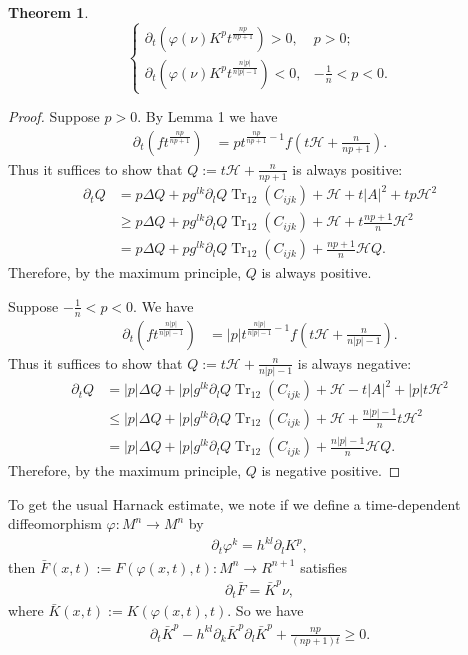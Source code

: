 \documentclass{amsart}
\newtheorem{theorem}{Theorem}
\theoremstyle{definition}
\theoremstyle{remark}
\DeclareMathOperator{\Tr}{Tr}
\numberwithin{equation}{section}
\begin{document}
\begin{theorem}
\[\left\{
  \begin{array}{ll}
    \partial_t \left(\varphi(\nu)K^pt^{\frac{n p }{n p +1}}\right)> 0, & p>0; \\
    \partial_t \left(\varphi(\nu)K^pt^{\frac{n |p| }{n |p| -1}}\right)<0, & -\frac{1}{n}<p<0.
  \end{array}
\right.
\]
\end{theorem}
\begin{proof}
Suppose $p>0.$
By Lemma 1 we have
\begin{align*}
\partial_t \left(ft^{\frac{n p }{n p +1}}\right)&= p  t^{\frac{n p }{n p +1}-1}f\left(t\mathcal{H}+\frac{n}{n p +1}\right).
\end{align*}
Thus it suffices to show that $Q:=t\mathcal{H}+\frac{n}{n p +1}$ is always positive:
\begin{align*}
\partial_t Q&= p\Delta Q+ p  g^{lk}\partial_lQ \Tr_{12}( C _{ijk})+\mathcal{H}+t| A |^2+  tp \mathcal{H}^2\\
&\geq  p \Delta Q+ p  g^{lk}\partial_lQ \Tr_{12}( C _{ijk})+\mathcal{H}+t\frac{n p +1}{n} \mathcal{H}^2\\
&= p \Delta Q+ p  g^{lk}\partial_lQ \Tr_{12}( C _{ijk})+\frac{n p +1}{n}\mathcal{H}Q.
\end{align*}
Therefore, by the maximum principle, $Q$ is always positive.


Suppose $-\frac{1}{n}<p<0.$ We have
\begin{align*}
\partial_t \left(ft^{\frac{n |p| }{n |p| -1}}\right)&= |p|  t^{\frac{n |p| }{n |p| -1}-1}f\left(t\mathcal{H}+\frac{n}{n |p| -1}\right).
\end{align*}
Thus it suffices to show that $Q:=t\mathcal{H}+\frac{n}{n |p| -1}$ is always negative:
\begin{align*}
\partial_t Q&= |p| \Delta Q+ |p|  g^{lk}\partial_lQ \Tr_{12}( C _{ijk})+\mathcal{H}-t| A |^2+ |p|  t \mathcal{H}^2\\
&\leq  |p| \Delta Q+ |p|  g^{lk}\partial_lQ \Tr_{12}( C _{ijk})+\mathcal{H}+\frac{n |p| -1}{n}t \mathcal{H}^2\\
&= |p| \Delta Q+ |p|  g^{lk}\partial_lQ \Tr_{12}( C _{ijk})+\frac{n |p| -1}{n}\mathcal{H}Q.
\end{align*}
Therefore, by the maximum principle, $Q$ is negative positive.
\end{proof}

To get the usual Harnack estimate, we note if we define a time-dependent diffeomorphism $\varphi: M^n\to M^n$ by
\begin{align}
\partial_t\varphi^k=h^{kl}\partial_l K^{ p },
\end{align}
then $\bar{F}(x,t):=F(\varphi(x,t),t):M^{n}\to R^{n+1}$ satisfies
\begin{align}
\partial_t\bar{F}=\bar{K}^{ p }\nu,
\end{align}
where $\bar{K}(x,t):=K(\varphi(x,t),t)$. So we have
\begin{align}
\partial_t\bar{K}^{ p }-h^{kl}\partial_k\bar{K}^{ p }\partial_l\bar{K}^{ p }+\frac{n p }{(n p +1)t}\geq 0.
\end{align}



\end{document}
